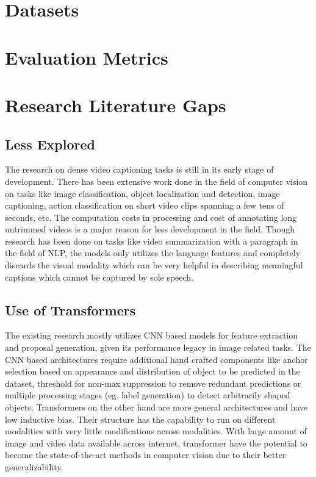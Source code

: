 \section{Datasets}

\section{Evaluation Metrics}




\section{Research Literature Gaps}
\subsection{Less Explored}
\par The research on dense video captioning tasks is still in its early stage of development. There has been extensive work done in the field of computer vision on tasks like image classification, object localization and detection, image captioning, action classification on short video clips spanning a few tens of seconds, etc. The computation costs in processing and cost of annotating long untrimmed videos is a major reason for less development in the field. Though research has been done on tasks like video summarization with a paragraph in the field of NLP, the models only utilizes the language features and completely discards the visual modality which can be very helpful in describing meaningful captions which cannot be captured by sole speech. 

\subsection{Use of Transformers}
\par The existing research mostly utilizes CNN based models for feature extraction and proposal generation, given its performance legacy in image related tasks. The CNN based architectures require additional hand crafted components like anchor selection based on appearance and distribution of object to be predicted in the dataset, threshold for non-max suppression to remove redundant predictions or multiple processing stages (eg. label generation) to detect arbitrarily shaped objects. Transformers on the other hand are more general architectures and have low inductive bias. Their structure has the capability to run on different modalities with very little modifications across modalities. With large amount of image and video data available across internet, transformer have the potential to become the state-of-the-art methods in computer vision due to their better generalizability.

